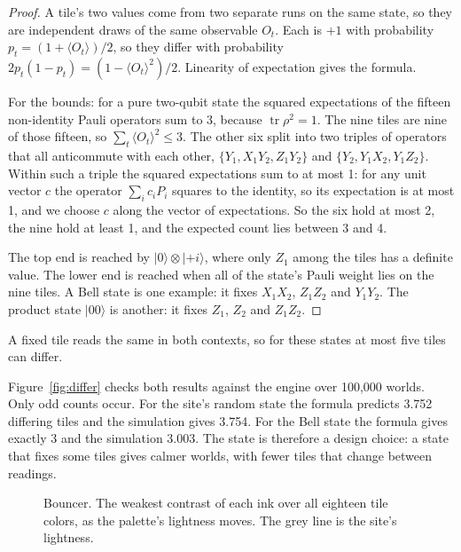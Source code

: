 \documentclass[11pt,a4paper]{article}
\newcommand{\ket}[1]{\lvert #1\rangle}
\newcommand{\expect}[1]{\langle #1\rangle}
\theoremstyle{qresult}
\begin{document}
\begin{proof}
A tile's two values come from two separate runs on the same state, so they are independent draws of the same
observable $O_t$. Each is $+1$ with probability $p_t = (1+\expect{O_t})/2$, so they differ with probability
$2p_t(1-p_t) = (1-\expect{O_t}^2)/2$. Linearity of expectation gives the formula.

For the bounds: for a pure two-qubit state the squared expectations of the fifteen non-identity Pauli operators sum to
3, because $\operatorname{tr}\rho^2 = 1$. The nine tiles are nine of those fifteen, so $\sum_t \expect{O_t}^2 \le 3$.
The other six split into two triples of operators that all anticommute with each other, $\{Y_1, X_1Y_2, Z_1Y_2\}$
and $\{Y_2, Y_1X_2, Y_1Z_2\}$. Within such a triple the squared expectations sum to at most 1: for any unit vector
$c$ the operator $\sum_i c_i P_i$ squares to the identity, so its expectation is at most 1, and we choose $c$ along
the vector of expectations. So the six hold at most 2, the nine hold at least 1, and the expected count lies between
3 and 4.

The top end is reached by $\ket{0}\otimes\ket{{+}i}$, where only $Z_1$ among the tiles has a definite value. The
lower end is reached when all of the state's Pauli weight lies on the nine tiles. A Bell state is one example: it
fixes $X_1X_2$, $Z_1Z_2$ and $Y_1Y_2$. The product state $\ket{00}$ is another: it fixes $Z_1$, $Z_2$ and $Z_1Z_2$.
\end{proof}

\noindent A fixed tile reads the same in both contexts, so for these states at most five tiles can differ.

Figure~\ref{fig:differ} checks both results against the engine over 100{,}000 worlds. Only odd counts occur. For the
site's random state the formula predicts 3.752 differing tiles and the simulation gives 3.754. For the Bell state the
formula gives exactly 3 and the simulation 3.003. The state is therefore a design choice: a state that fixes some
tiles gives calmer worlds, with fewer tiles that change between readings.

\begin{figure}[tb]
  \centering
  \begin{minipage}[t]{0.49\linewidth}
    \centering
    \resizebox{\linewidth}{!}{}
    \caption{How many tiles differ between the two readings, over 100{,}000 worlds. Only odd counts occur.}
    \label{fig:differ}
  \end{minipage}\hfill
  \begin{minipage}[t]{0.49\linewidth}
    \centering
    \resizebox{\linewidth}{!}{}
    \caption{Bouncer. The weakest contrast of each ink over all eighteen tile colors, as the palette's lightness
    moves. The grey line is the site's lightness.}
    \label{fig:bouncer}
  \end{minipage}
\end{figure}
\end{document}
